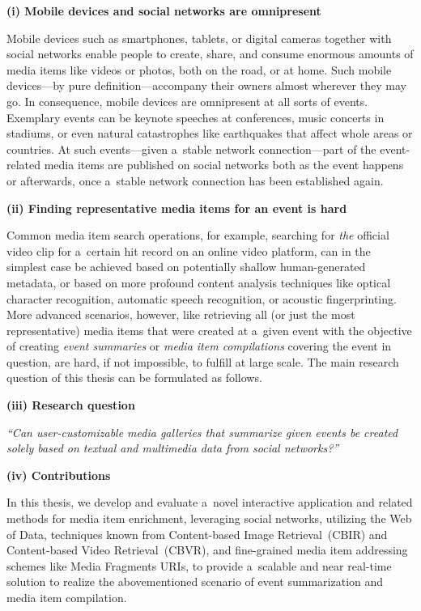 \begin{abstracts}

\textbf{(i) Mobile devices and social networks are omnipresent}

Mobile devices such as smartphones, tablets, or digital cameras
together with social networks enable people to create,
share, and consume enormous amounts of media items
like videos or photos, both on the road, or at home.
Such mobile devices---by pure definition---accompany
their owners almost wherever they may go.
In consequence, mobile devices are omnipresent
at all sorts of events.
Exemplary events can be keynote speeches at conferences,
music concerts in stadiums,
or even natural catastrophes like earthquakes
that affect whole areas or countries.
At such events---given a~stable network connection---part of
the event-related media items are published on social networks
both as the event happens or afterwards,
once a~stable network connection has been established again.

\textbf{(ii) Finding representative media items
for an event is hard}

Common media item search operations,
for example, searching for \emph{the} official video clip
for a~certain hit record on an online video platform,
can in the simplest case be achieved based on potentially
shallow human-generated metadata,
or based on more profound content analysis techniques
like optical character recognition,
automatic speech recognition,
or acoustic fingerprinting.
More advanced scenarios, however, like retrieving all
(or just the most representative) media items
that were created at a~given event
with the objective of creating \emph{event summaries} or
\emph{media item compilations} covering the event in question,
are hard, if not impossible, to fulfill at large scale.
The main research question of this thesis
can be formulated as follows.

\textbf{(iii) Research question}

\textit{``Can user-customizable media galleries
that summarize given events be\linebreak
created solely based on textual and multimedia data
from social networks?''}

\textbf{(iv) Contributions}

In this thesis, we develop and evaluate
a~novel interactive application and related methods
for media item enrichment,
leveraging social networks, utilizing the Web of Data,
techniques known from Content-based Image Retrieval~(CBIR)
and Content-based Video Retrieval~(CBVR),
and fine-grained media item addressing schemes
like Media Fragments URIs,
to provide a~scalable and near real-time solution
to realize the abovementioned scenario
of event summarization and media item compilation.


\end{abstracts}
